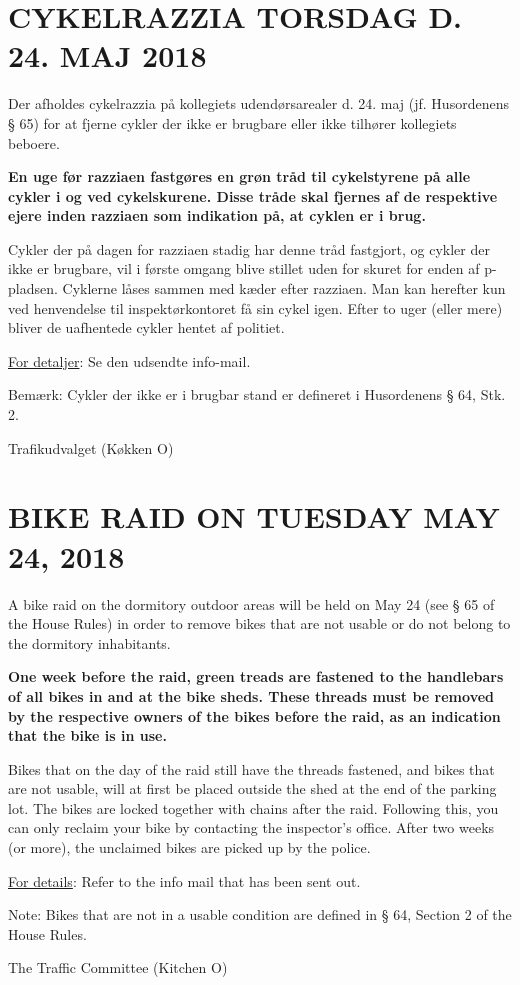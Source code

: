 \documentclass[12pt,a4paper]{article}
\begin{document}
\section*{CYKELRAZZIA TORSDAG D. 24. MAJ 2018}
Der afholdes cykelrazzia på kollegiets udendørsarealer d. 24. maj (jf. Husordenens § 65) for at fjerne cykler der ikke er brugbare eller ikke tilhører kollegiets beboere. 

\textbf{En uge før razziaen fastgøres en grøn tråd til cykelstyrene på alle cykler i og ved cykelskurene. Disse tråde skal fjernes af de respektive ejere inden razziaen som indikation på, at cyklen er i brug.}

Cykler der på dagen for razziaen stadig har denne tråd fastgjort, og cykler der ikke er brugbare, vil i første omgang blive stillet uden for skuret for enden af p-pladsen. Cyklerne låses sammen med kæder efter razziaen. Man kan herefter kun ved henvendelse til inspektørkontoret få sin cykel igen. Efter to uger (eller mere) bliver de uafhentede cykler hentet af politiet. 

\underline{For detaljer}: Se den udsendte info-mail.

Bemærk: Cykler der ikke er i brugbar stand er defineret i Husordenens § 64, Stk. 2. 
 
\hspace*{2cm} Trafikudvalget (Køkken O)
 
\section*{BIKE RAID ON TUESDAY MAY 24, 2018}
A bike raid on the dormitory outdoor areas will be held on May 24 (see § 65 of the House Rules) in order to remove bikes that are not usable or do not belong to the dormitory inhabitants. 

\textbf{One week before the raid, green treads are fastened to the handlebars of all bikes in and at the bike sheds. These threads must be removed by the respective owners of the bikes before the raid, as an indication that the bike is in use.}

Bikes that on the day of the raid still have the threads fastened, and bikes that are not usable, will at first be placed outside the shed at the end of the parking lot. The bikes are locked together with chains after the raid. Following this, you can only reclaim your bike by contacting the inspector’s office. After two weeks (or more), the unclaimed bikes are picked up by the police. 

\underline{For details}: Refer to the info mail that has been sent out.

Note: Bikes that are not in a usable condition are defined in § 64, Section 2 of the House Rules.

\hspace*{2cm} The Traffic Committee (Kitchen O)
\end{document}
